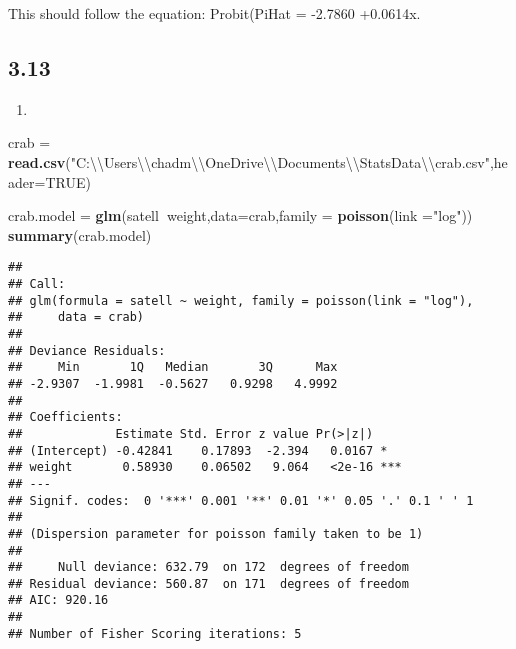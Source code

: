 \documentclass[
]{article}
\newenvironment{Shaded}{\begin{snugshade}}{\end{snugshade}}
\newcommand{\CharTok}[1]{\textcolor[rgb]{0.31,0.60,0.02}{#1}}
\newcommand{\DataTypeTok}[1]{\textcolor[rgb]{0.13,0.29,0.53}{#1}}
\newcommand{\KeywordTok}[1]{\textcolor[rgb]{0.13,0.29,0.53}{\textbf{#1}}}
\newcommand{\NormalTok}[1]{#1}
\newcommand{\OperatorTok}[1]{\textcolor[rgb]{0.81,0.36,0.00}{\textbf{#1}}}
\newcommand{\OtherTok}[1]{\textcolor[rgb]{0.56,0.35,0.01}{#1}}
\newcommand{\StringTok}[1]{\textcolor[rgb]{0.31,0.60,0.02}{#1}}
\begin{document}
This should follow the equation: Probit(PiHat = -2.7860 +0.0614x.

\hypertarget{section-3}{%
\subsection{3.13}\label{section-3}}

\begin{enumerate}
\def\labelenumi{\alph{enumi})}
\item
\end{enumerate}

\begin{Shaded}
\begin{Highlighting}[]
\NormalTok{crab =}\StringTok{ }\KeywordTok{read.csv}\NormalTok{(}\StringTok{"C:}\CharTok{\textbackslash{}\textbackslash{}}\StringTok{Users}\CharTok{\textbackslash{}\textbackslash{}}\StringTok{chadm}\CharTok{\textbackslash{}\textbackslash{}}\StringTok{OneDrive}\CharTok{\textbackslash{}\textbackslash{}}\StringTok{Documents}\CharTok{\textbackslash{}\textbackslash{}}\StringTok{StatsData}\CharTok{\textbackslash{}\textbackslash{}}\StringTok{crab.csv"}\NormalTok{,}\DataTypeTok{header=}\OtherTok{TRUE}\NormalTok{)}

\NormalTok{crab.model =}\StringTok{ }\KeywordTok{glm}\NormalTok{(satell}\OperatorTok{~}\NormalTok{weight,}\DataTypeTok{data=}\NormalTok{crab,}\DataTypeTok{family =} \KeywordTok{poisson}\NormalTok{(}\DataTypeTok{link =}\StringTok{"log"}\NormalTok{))}
\KeywordTok{summary}\NormalTok{(crab.model)}
\end{Highlighting}
\end{Shaded}

\begin{verbatim}
## 
## Call:
## glm(formula = satell ~ weight, family = poisson(link = "log"), 
##     data = crab)
## 
## Deviance Residuals: 
##     Min       1Q   Median       3Q      Max  
## -2.9307  -1.9981  -0.5627   0.9298   4.9992  
## 
## Coefficients:
##             Estimate Std. Error z value Pr(>|z|)    
## (Intercept) -0.42841    0.17893  -2.394   0.0167 *  
## weight       0.58930    0.06502   9.064   <2e-16 ***
## ---
## Signif. codes:  0 '***' 0.001 '**' 0.01 '*' 0.05 '.' 0.1 ' ' 1
## 
## (Dispersion parameter for poisson family taken to be 1)
## 
##     Null deviance: 632.79  on 172  degrees of freedom
## Residual deviance: 560.87  on 171  degrees of freedom
## AIC: 920.16
## 
## Number of Fisher Scoring iterations: 5
\end{verbatim}
\end{document}
